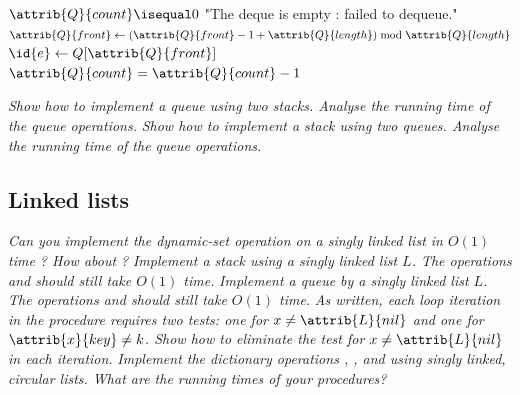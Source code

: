 \begin{description}
\begin{ex}
\begin{codebox}
\end{codebox}
\begin{codebox}
    \li \If $\attrib{Q}{count}\isequal0$ \Then
        \li \Error "The deque is empty : failed to dequeue." \End
    \li  $\attrib{Q}{front} \gets (\attrib{Q}{front} -1 + \attrib{Q}{length}) \bmod \attrib{Q}{length}$
    \li  $\id{e} \gets Q[\attrib{Q}{front}]$ 
    \li  $\attrib{Q}{count} = \attrib{Q}{count}-1$
    \li \Return {}
\end{codebox}
\end{ex}
 \textit{Show how to implement a queue using two stacks. Analyse the running time of the queue operations.}
 \textit{Show how to implement a stack using two queues. Analyse the running time of the queue operations.}


\end{description}

\subsection{Linked lists}
\label{sub:linked_lists}

\begin{description}
     \textit{Can you implement the dynamic-set operation  on a singly linked list in $O(1)$ time ? How about  ?}
     \textit{Implement a stack using a singly linked list $L$. The operations  and  should still take $O(1)$ time.}
     \textit{Implement a queue by a singly linked list $L$. The operations  and  should still take $O(1)$ time.}
     \textit{As written, each loop iteration in the  procedure requires two tests: one for $x \neq \attrib {L}{nil}$ and one for $\attrib{x}{key} \neq k$. Show how to eliminate the test for $x \neq \attrib{L}{nil}$ in each iteration.}
     \textit{Implement the dictionary operations , , and  using singly linked, circular lists. What are the running times of your procedures?}
     \textit{}
     \textit{}
     \textit{}
\end{description}
